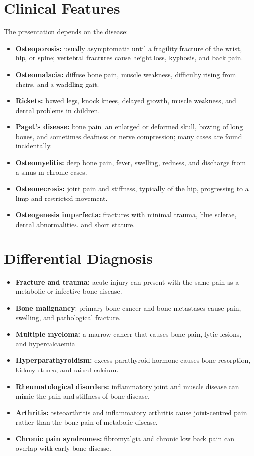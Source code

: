 \section*{Clinical Features}
The presentation depends on the disease:
\begin{itemize}
    \item \textbf{Osteoporosis:} usually asymptomatic until a fragility fracture of the wrist, hip, or spine; vertebral fractures cause height loss, kyphosis, and back pain.
    \item \textbf{Osteomalacia:} diffuse bone pain, muscle weakness, difficulty rising from chairs, and a waddling gait.
    \item \textbf{Rickets:} bowed legs, knock knees, delayed growth, muscle weakness, and dental problems in children.
    \item \textbf{Paget's disease:} bone pain, an enlarged or deformed skull, bowing of long bones, and sometimes deafness or nerve compression; many cases are found incidentally.
    \item \textbf{Osteomyelitis:} deep bone pain, fever, swelling, redness, and discharge from a sinus in chronic cases.
    \item \textbf{Osteonecrosis:} joint pain and stiffness, typically of the hip, progressing to a limp and restricted movement.
    \item \textbf{Osteogenesis imperfecta:} fractures with minimal trauma, blue sclerae, dental abnormalities, and short stature.
\end{itemize}

\section*{Differential Diagnosis}
\begin{itemize}
    \item \textbf{Fracture and trauma:} acute injury can present with the same pain as a metabolic or infective bone disease.
    \item \textbf{Bone malignancy:} primary bone cancer and bone metastases cause pain, swelling, and pathological fracture.
    \item \textbf{Multiple myeloma:} a marrow cancer that causes bone pain, lytic lesions, and hypercalcaemia.
    \item \textbf{Hyperparathyroidism:} excess parathyroid hormone causes bone resorption, kidney stones, and raised calcium.
    \item \textbf{Rheumatological disorders:} inflammatory joint and muscle disease can mimic the pain and stiffness of bone disease.
    \item \textbf{Arthritis:} osteoarthritis and inflammatory arthritis cause joint-centred pain rather than the bone pain of metabolic disease.
    \item \textbf{Chronic pain syndromes:} fibromyalgia and chronic low back pain can overlap with early bone disease.
\end{itemize}

